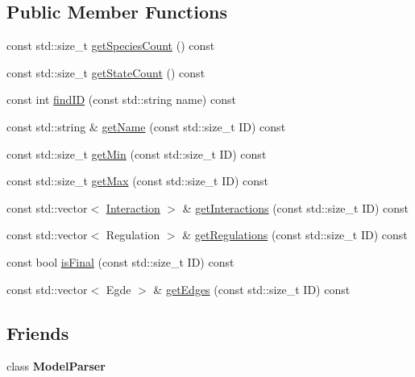 \subsection*{Public Member Functions}
\begin{DoxyCompactItemize}
\item 
const std\-::size\-\_\-t \hyperlink{class_model_ae85881ab9e7e6ed301ee3119bb77f4a2}{get\-Species\-Count} () const 
\item 
const std\-::size\-\_\-t \hyperlink{class_model_a215555b2d34d4af35a825db275ff9934}{get\-State\-Count} () const 
\item 
const int \hyperlink{class_model_ac011a583a9499842f4f88177778fc9e7}{find\-I\-D} (const std\-::string name) const 
\item 
const std\-::string \& \hyperlink{class_model_a80f0c690cc256c060b235e3a8ba819a1}{get\-Name} (const std\-::size\-\_\-t I\-D) const 
\item 
const std\-::size\-\_\-t \hyperlink{class_model_a44b7e43f2b539d051bb8c51a220a9e93}{get\-Min} (const std\-::size\-\_\-t I\-D) const 
\item 
const std\-::size\-\_\-t \hyperlink{class_model_a11f26c6383852928c361019f0ca07b19}{get\-Max} (const std\-::size\-\_\-t I\-D) const 
\item 
const std\-::vector$<$ \hyperlink{struct_model_1_1_interaction}{Interaction} $>$ \& \hyperlink{class_model_a2ee1c6459fdb69c9c754f77e15c1cf71}{get\-Interactions} (const std\-::size\-\_\-t I\-D) const 
\item 
const std\-::vector$<$ Regulation $>$ \& \hyperlink{class_model_af9cab24dce8973a2e9e510eae848cbd9}{get\-Regulations} (const std\-::size\-\_\-t I\-D) const 
\item 
const bool \hyperlink{class_model_a25f07417a98514d45c48f3a8d0c6fb24}{is\-Final} (const std\-::size\-\_\-t I\-D) const 
\item 
const std\-::vector$<$ Egde $>$ \& \hyperlink{class_model_abb52df1a8ca9abfddf430f43d2b674d7}{get\-Edges} (const std\-::size\-\_\-t I\-D) const 
\end{DoxyCompactItemize}
\subsection*{Friends}
\begin{DoxyCompactItemize}
\item 
\hypertarget{class_model_a2759f637c8f028a9ed4256db41bf34ac}{class {\bfseries Model\-Parser}}\label{class_model_a2759f637c8f028a9ed4256db41bf34ac}

\end{DoxyCompactItemize}


